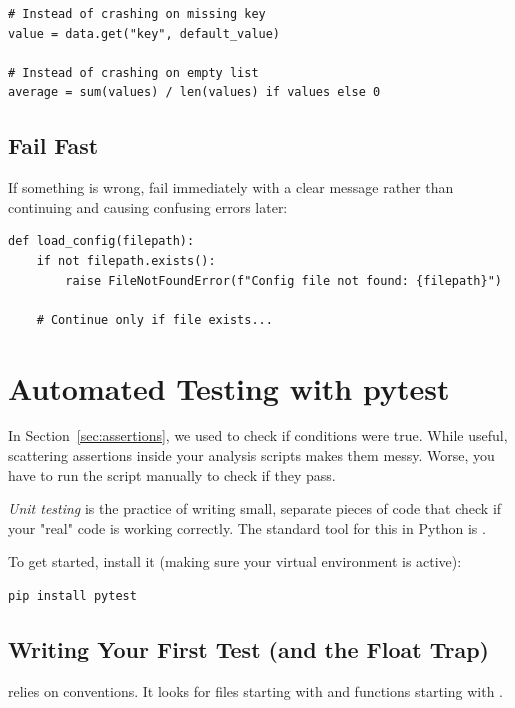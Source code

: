 \begin{lstlisting}
# Instead of crashing on missing key
value = data.get("key", default_value)

# Instead of crashing on empty list
average = sum(values) / len(values) if values else 0
\end{lstlisting}

\subsection{Fail Fast}

If something is wrong, fail immediately with a clear message rather than continuing and causing confusing errors later:

\begin{lstlisting}
def load_config(filepath):
    if not filepath.exists():
        raise FileNotFoundError(f"Config file not found: {filepath}")

    # Continue only if file exists...
\end{lstlisting}

\section{Automated Testing with pytest}
\label{sec:pytest}

In Section~\ref{sec:assertions}, we used  to check if conditions were true. While useful, scattering assertions inside your analysis scripts makes them messy. Worse, you have to run the script manually to check if they pass.

\emph{Unit testing} is the practice of writing small, separate pieces of code that check if your "real" code is working correctly. The standard tool for this in Python is .

To get started, install it (making sure your virtual environment is active):

\begin{lstlisting}
pip install pytest
\end{lstlisting}

\subsection{Writing Your First Test (and the Float Trap)}

 relies on conventions. It looks for files starting with  and functions starting with .

